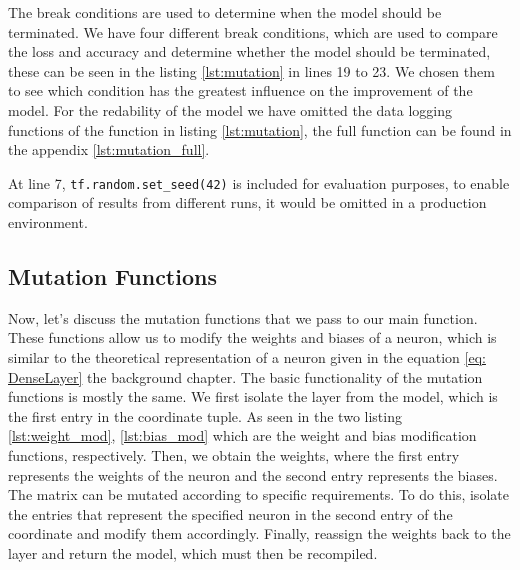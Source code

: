 The break conditions are used to determine when the model should be terminated.
We have four different break conditions, which are used to compare the loss and accuracy and determine whether the model should be terminated, these can be seen in the listing \ref{lst:mutation} in lines 19 to 23.
We chosen them to see which condition has the greatest influence on the improvement of the model.
For the redability of the model we have omitted the data logging functions of the function in listing \ref{lst:mutation}, the full function can be found in the appendix \ref{lst:mutation_full}.

At line 7, \texttt{tf.random.set\_seed(42)} is included for evaluation purposes, to enable comparison of results from different runs, it would be omitted in a production environment.



\subsection{Mutation Functions}\label{subsec:mutation-functions}
Now, let's discuss the mutation functions that we pass to our main function.
These functions allow us to modify the weights and biases of a neuron, which is similar to the theoretical representation of a neuron given in the equation \ref{eq: DenseLayer} the background chapter.
The basic functionality of the mutation functions is mostly the same.
We first isolate the layer from the model, which is the first entry in the coordinate tuple.
As seen in the two listing \ref{lst:weight_mod}, \ref{lst:bias_mod} which are the weight and bias modification functions, respectively.
Then, we obtain the weights, where the first entry represents the weights of the neuron and the second entry represents the biases.
The matrix can be mutated according to specific requirements.
To do this, isolate the entries that represent the specified neuron in the second entry of the coordinate and modify them accordingly.
Finally, reassign the weights back to the layer and return the model, which must then be recompiled.




